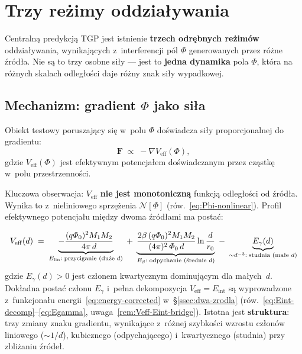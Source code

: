 \section{Trzy re\.zimy oddzia\l{}ywania}\label{sec:rezimy}

Centraln\k{a} predykcj\k{a} TGP jest istnienie \textbf{trzech odr\k{e}bnych
re\.zim\'ow} oddzia\l{}ywania, wynikaj\k{a}cych z~interferencji p\'ol $\Phi$
generowanych przez r\'o\.zne \'zr\'od\l{}a. Nie s\k{a} to trzy osobne si\l{}y ---
jest to \textbf{jedna dynamika} pola $\Phi$, kt\'ora na r\'o\.znych
skalach odleg\l{}o\'sci daje r\'o\.zny znak si\l{}y wypadkowej.

\subsection{Mechanizm: gradient $\Phi$ jako si\l{}a}\label{ssec:mechanizm}

Obiekt testowy poruszaj\k{a}cy si\k{e} w~polu $\Phi$ do\'swiadcza
si\l{}y proporcjonalnej do gradientu:
\begin{equation}\label{eq:force}
    \mathbf{F} \;\propto\; -\nabla V_{\mathrm{eff}}(\Phi),
\end{equation}
gdzie $V_{\mathrm{eff}}(\Phi)$ jest efektywnym potencja\l{}em
do\'swiadczanym przez cz\k{a}stk\k{e} w~polu przestrzenno\'sci.

Kluczowa obserwacja: $V_{\mathrm{eff}}$ \textbf{nie jest
monotoniczn\k{a}} funkcj\k{a} odleg\l{}o\'sci od \'zr\'od\l{}a. Wynika to
z~nieliniowego sprz\k{e}\.zenia $\mathcal{N}[\Phi]$
(r\'ow.~\ref{eq:Phi-nonlinear}). Profil efektywnego potencja\l{}u
mi\k{e}dzy dwoma \'zr\'od\l{}ami ma posta\'c:

\begin{equation}\label{eq:Veff-profile}
    V_{\mathrm{eff}}(d) \;=\;
    \underbrace{-\frac{(q\PhiZero)^2 M_1 M_2}{4\pi\,d}}_{%
      E_{\mathrm{lin}}:\;\text{przyci\k{a}ganie (du\.ze }d\text{)}}
    \;+\;
    \underbrace{\frac{2\beta\,(q\PhiZero)^2 M_1 M_2}
      {(4\pi)^2\,\PhiZero\,d}\ln\frac{d}{r_0}}_{%
      E_\beta:\;\text{odpychanie (\'srednie }d\text{)}}
    \;-\;
    \underbrace{E_\gamma(d)}_{%
      \sim d^{-3}:\;\text{studnia (ma\l{}e }d\text{)}}
\end{equation}
gdzie $E_\gamma(d) > 0$ jest cz\l{}onem kwartycznym dominuj\k{a}cym
dla ma\l{}ych~$d$. Dok\l{}adna posta\'c cz\l{}onu $E_\gamma$
i~pe\l{}na dekompozycja $V_{\mathrm{eff}} = E_{\mathrm{int}}$
s\k{a} wyprowadzone z~funkcjona\l{}u
energii~\eqref{eq:energy-corrected} w~\S\ref{ssec:dwa-zrodla}
(r\'ow.~\ref{eq:Eint-decomp}--\ref{eq:Egamma},
uwaga~\ref{rem:Veff-Eint-bridge}).
Istotna jest \textbf{struktura}: trzy zmiany znaku gradientu,
wynikaj\k{a}ce z~r\'o\.znej szybko\'sci wzrostu cz\l{}on\'ow
liniowego ($\sim 1/d$), kubicznego (odpychaj\k{a}cego)
i~kwartycznego (studnia) przy zbli\.zaniu \'zr\'ode\l{}.


